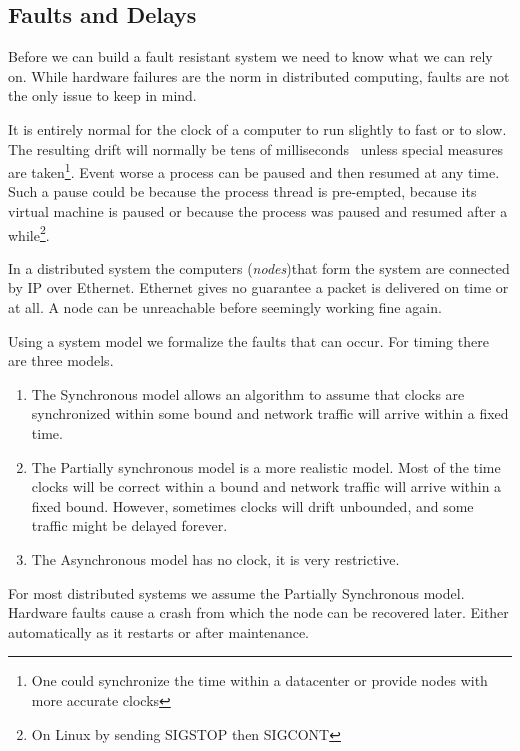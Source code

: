 \subsection{Faults and Delays} \label{sec:faults}
Before we can build a fault resistant system we need to know what we can rely on. While hardware failures are the norm in distributed computing, faults are not the only issue to keep in mind. 

It is entirely normal for the clock of a computer to run slightly to fast or to slow. The resulting drift will normally be tens of milliseconds~\cite{time} unless special measures are taken\footnote{One could synchronize the time within a datacenter or provide nodes with more accurate clocks}. Event worse a process can be paused and then resumed at any time. Such a pause could be because the process thread is pre-empted, because its virtual machine is paused or because the process was paused and resumed after a while\footnote{On Linux by sending SIGSTOP then SIGCONT}. 

In a distributed system the computers (\textit{nodes})that form the system are connected by IP over Ethernet. Ethernet gives no guarantee a packet is delivered on time or at all. A node can be unreachable before seemingly working fine again.

Using a system model we formalize the faults that can occur. For timing there are three models. 
\begin{enumerate}
	\item The Synchronous model allows an algorithm to assume that clocks are synchronized within some bound and network traffic will arrive within a fixed time.
	\item The Partially synchronous model is a more realistic model. Most of the time clocks will be correct within a bound and network traffic will arrive within a fixed bound. However, sometimes clocks will drift unbounded, and some traffic might be delayed forever.
	\item The Asynchronous model has no clock, it is very restrictive.
\end{enumerate}

For most distributed systems we assume the Partially Synchronous model. Hardware faults cause a crash from which the node can be recovered later. Either automatically as it restarts or after maintenance.
